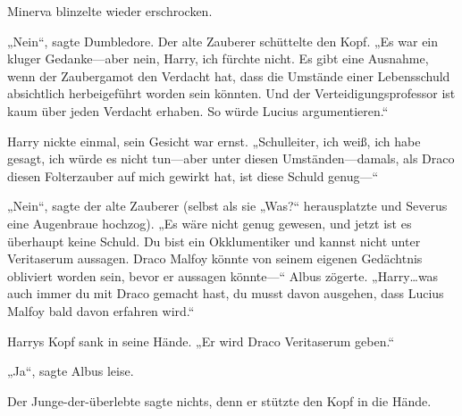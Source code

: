 Minerva blinzelte wieder erschrocken.

„Nein“, sagte Dumbledore. Der alte Zauberer schüttelte den Kopf.
„Es war ein kluger Gedanke—aber nein, Harry, ich fürchte nicht. Es gibt eine Ausnahme, wenn der Zaubergamot den Verdacht hat, dass die Umstände einer Lebensschuld absichtlich herbeigeführt worden sein könnten. Und der Verteidigungsprofessor ist kaum über jeden Verdacht erhaben. So würde Lucius argumentieren.“

Harry nickte einmal, sein Gesicht war ernst.
„Schulleiter, ich weiß, ich habe gesagt, ich würde es nicht tun—aber unter diesen Umständen—damals, als Draco diesen Folterzauber auf mich gewirkt hat, ist diese Schuld genug—“

„Nein“, sagte der alte Zauberer (selbst als sie
„Was?“ herausplatzte und Severus eine Augenbraue hochzog).
„Es wäre nicht genug gewesen, und jetzt ist es überhaupt keine Schuld. Du bist ein Okklumentiker und kannst nicht unter Veritaserum aussagen. Draco Malfoy könnte von seinem eigenen Gedächtnis obliviert worden sein, bevor er aussagen könnte—“ Albus zögerte.
„Harry…was auch immer du mit Draco gemacht hast, du musst davon ausgehen, dass Lucius Malfoy bald davon erfahren wird.“

Harrys Kopf sank in seine Hände.
„Er wird Draco Veritaserum geben.“

„Ja“, sagte Albus leise.

Der Junge-der-überlebte sagte nichts, denn er stützte den Kopf in die Hände.

